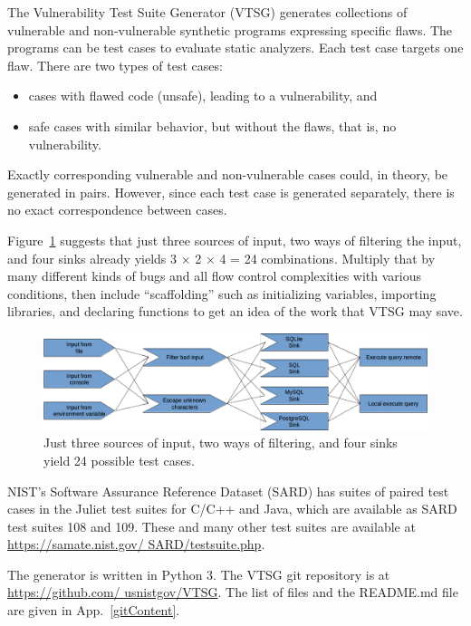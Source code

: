 \documentclass[12pt]{article}
\begin{document}
The Vulnerability Test Suite Generator (VTSG) generates collections 
of vulnerable and non-vulnerable
synthetic programs expressing specific flaws.  
The programs can be
test cases to evaluate static analyzers. 
Each test case targets one flaw. There are two types of test cases:
\begin{itemize}[nosep]
  \item cases with flawed code (unsafe), leading to a vulnerability, and
  \item safe cases with similar behavior, but without the flaws, that is, no
	vulnerability.
\end{itemize}
Exactly corresponding vulnerable and non-vulnerable
cases could, in theory, be generated in pairs. However, since each test case
is generated separately, there is no exact correspondence between 
cases.

Figure~\ref{fig:cartesian product} suggests that just three sources of input,
two ways of filtering the input, and four sinks already yields 3 × 2 × 4 = 24
combinations.  Multiply that by many different kinds of bugs and all flow control
complexities with various conditions, then include ``scaffolding'' such as
initializing variables, importing libraries, and declaring functions to get an
idea of the work that VTSG may save.

\begin{figure}[htbp]
  \includegraphics[width=1\linewidth]{fig_cartesian_product.png}
  \caption{Just three sources of input, two ways of filtering, and four sinks
    yield 24 possible test cases.}
  \label{fig:cartesian product}
\end{figure}

NIST's Software Assurance Reference Dataset (SARD) has suites of paired test cases in
the Juliet test suites for C/C++ and Java, which are available as SARD test suites
108 and 109.  These and many other test suites are available at
\href{https://samate.nist.gov/SARD/testsuite.php}
     {https://samate.nist.gov/ SARD/testsuite.php}.

The generator is written in Python 3.
The VTSG git repository is at
\href{https://github.com/usnistgov/VTSG}{https://github.com/ usnistgov/VTSG}.
The list of files and the README.md file are given in App.~\ref{gitContent}.
\end{document}
